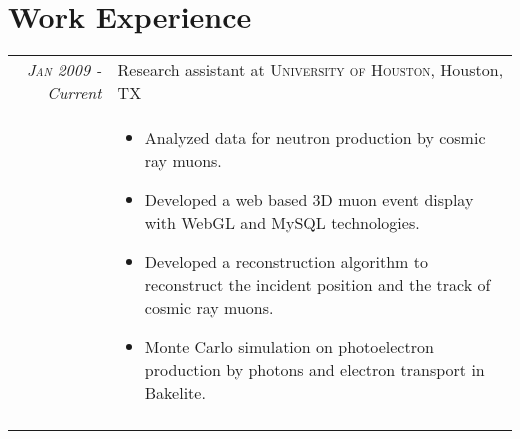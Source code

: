 \documentclass[11pt]{article} %
\begin{document}
\section{Work Experience}

\begin{tabular}{r|p{12cm}}
\hspace{5 mm}\emph{\textsc{Jan 2009} - Current} & Research assistant at \textsc{University of Houston}, Houston, TX \\
& \small
\begin{itemize}
  \item	Analyzed data for neutron production by cosmic ray muons.
  \item Developed a web based 3D muon event display with WebGL and MySQL technologies.
  \item Developed a reconstruction algorithm to reconstruct the incident position and the track of cosmic ray muons.
  \item Monte Carlo simulation on photoelectron production by photons and electron transport in Bakelite.
\end{itemize}\\
\multicolumn{2}{c}{} \\
\end{tabular}\newpage
\end{document}
